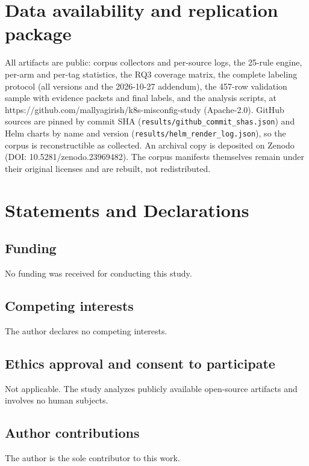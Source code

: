 \documentclass[pdflatex,sn-basic]{sn-jnl}
\begin{document}
\hypertarget{data-availability-and-replication-package}{%
\section*{Data availability and replication
package}\label{data-availability-and-replication-package}}

All artifacts are public: corpus collectors and per-source logs, the
25-rule engine, per-arm and per-tag statistics, the RQ3 coverage matrix,
the complete labeling protocol (all versions and the 2026-10-27
addendum), the 457-row validation sample with evidence packets and final
labels, and the analysis scripts, at
https://github.com/mallyagirish/k8s-misconfig-study (Apache-2.0). GitHub
sources are pinned by commit SHA
(\texttt{results/github\_commit\_shas.json}) and Helm charts by name and
version (\texttt{results/helm\_render\_log.json}), so the corpus is
reconstructible as collected. An archival copy is deposited on Zenodo (DOI:
10.5281/zenodo.23969482). The corpus manifests themselves remain under their original
licenses and are rebuilt, not redistributed.

\section*{Statements and Declarations}

\subsection*{Funding}
No funding was received for conducting this study.

\subsection*{Competing interests}
The author declares no competing interests.

\subsection*{Ethics approval and consent to participate}
Not applicable. The study analyzes publicly available open-source artifacts
and involves no human subjects.

\subsection*{Author contributions}
The author is the sole contributor to this work.
\end{document}
